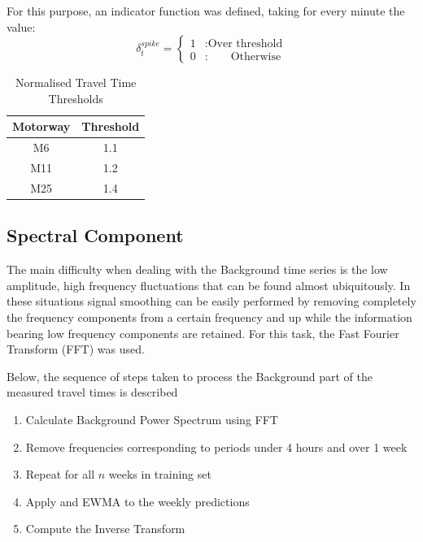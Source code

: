\documentclass[conference, letterpaper]{IEEEtran}
\begin{document}
For this purpose, an indicator function was defined, taking for every minute the value:\\
\begin{equation}
\delta_t^{spike}= \left\{
\begin{array}{lr}
1 & : \textrm{Over threshold}\\
0 & : \,\,\,\,\,\,\,\,\,\,\,\,\textrm{Otherwise}
\end{array}
\right.
\label{eq:delta}
\end{equation}

\begin{table}[htbp]
	\caption{Normalised Travel Time Thresholds}
	\begin{center}
		\begin{tabular}{|c|c|}
			\hline
			\textbf{Motorway}&{\textbf{Threshold}} \\
			\hline
			M6& 1.1\\
			\hline
			M11& 1.2\\
			\hline
			M25& 1.4\\
			\hline
		\end{tabular}
		\label{tab1}
	\end{center}
\end{table}

\subsection{Spectral Component}
The main difficulty when dealing with the Background time series is the low amplitude, high frequency fluctuations that can be found almost ubiquitously. 
In these situations signal smoothing can be easily performed by removing completely the frequency components from a certain frequency and up while the information bearing low frequency components are retained. For this task, the Fast Fourier Transform (FFT) \cite{FFT} was used.

Below, the sequence of steps taken to process the Background part of the measured travel times is described
\begin{enumerate}

	\item Calculate Background Power Spectrum using FFT
	\item Remove frequencies corresponding to periods under 4 hours and over 1 week
	\item Repeat for all $n$ weeks in training set
    \item Apply and EWMA to the weekly predictions
	\item Compute the Inverse Transform

\end{enumerate}
\end{document}
